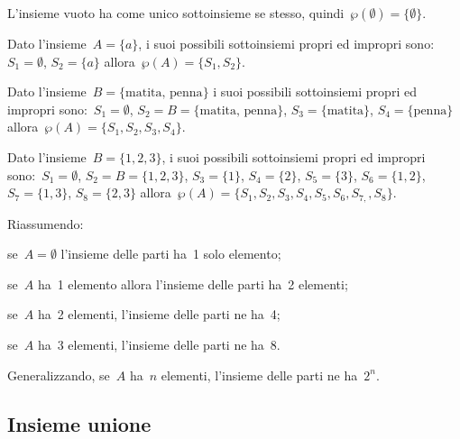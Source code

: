 \begin{exrig}
 \begin{esempio}
 L'insieme vuoto ha come unico sottoinsieme se stesso,
quindi~$\wp (\emptyset )=\{\emptyset \}$.
 \end{esempio}

\begin{esempio}
 Dato l'insieme~$A=\{a\}$, i suoi possibili sottoinsiemi
propri ed impropri sono:~$S_{1}=\emptyset$, $S_{2}=\{a\}$
allora~$\wp (A)=\{S_{1},S_{2}\}$.
 \end{esempio}

\begin{esempio}
 Dato l'insieme~$B=\{\text{matita, penna}\}$ i
suoi possibili sottoinsiemi propri ed impropri sono:~$S_{1}=\emptyset$,
$S_{2}=B=\{\text{matita, penna}\}$, $S_{3}=\{\text{matita}\}$,
$S_{4}=\{\text{penna}\}$
allora~$\wp (A)=\{S_{1}, S_{2}, S_{3}, S_{4}\}$.
 \end{esempio}

\begin{esempio}
 Dato l'insieme~$B=\{1,2,3\}$, i suoi possibili
sottoinsiemi propri ed impropri sono:~$S_{1}=\emptyset$,
$S_{2}=B=\{1,2,3\}$, $S_{3}=\{1\}$, $S_{4}=\{2\}$, $S_{5}=\{3\}$,
$S_{6}=\{1,2\}$, $S_{7}=\{1,3\}$, $S_{8}=\{2,3\}$
allora~$\wp (A)=\{S_{1}, S_{2}, S_{3}, S_{4}, S_{5}, S_{6}, S_{7,}, S_{8}\}$.
 \end{esempio}
 \end{exrig}

 Riassumendo:
\begin{itemize*}
\item se~$A=\emptyset $ l'insieme delle parti ha~1 solo elemento;
\item se~$A$ ha~1 elemento allora l'insieme delle parti ha~2 elementi;
\item se~$A$ ha~2 elementi, l'insieme delle parti ne ha~4;
\item se~$A$ ha~3 elementi, l'insieme delle parti ne ha~8.
\end{itemize*}

Generalizzando, se~$A$ ha~$n$ elementi, l'insieme delle parti ne ha~$2^{n}$.


\subsection{Insieme unione}
\label{subsec:op_unione}


